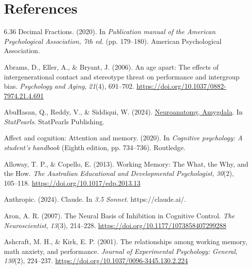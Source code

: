 \documentclass[
  stu, a4paper,floatsintext]{apa7}
\newlength{\cslhangindent}
\newenvironment{CSLReferences}[2] %
 {\begin{list}{}{%
  \setlength{\itemindent}{0pt}
  \setlength{\leftmargin}{0pt}
  \setlength{\parsep}{0pt}
  \ifodd #1
   \setlength{\leftmargin}{\cslhangindent}
   \setlength{\itemindent}{-1\cslhangindent}
  \fi
  \setlength{\itemsep}{#2\baselineskip}}}
 {\end{list}}
\begin{document}
\newpage

\section{References}\label{references}

\label{refs}
\begin{CSLReferences}{1}{0}
6.36 {Decimal Fractions}. (2020). In \emph{Publication manual of the {American Psychological Association}, 7th ed.} (pp. 179--180). American Psychological Association.

Abrams, D., Eller, A., \& Bryant, J. (2006). An age apart: {The} effects of intergenerational contact and stereotype threat on performance and intergroup bias. \emph{Psychology and Aging}, \emph{21}(4), 691--702. \url{https://doi.org/10.1037/0882-7974.21.4.691}

AbuHasan, Q., Reddy, V., \& Siddiqui, W. (2024). \href{https://www.ncbi.nlm.nih.gov/pubmed/30725787}{Neuroanatomy, {Amygdala}}. In \emph{{StatPearls}}. StatPearls Publishing.

Affect and cognition: Attention and memory. (2020). In \emph{Cognitive psychology: A student's handbook} (Eighth edition, pp. 734--736). Routledge.

Alloway, T. P., \& Copello, E. (2013). Working {Memory}: {The What}, the {Why}, and the {How}. \emph{The Australian Educational and Developmental Psychologist}, \emph{30}(2), 105--118. \url{https://doi.org/10.1017/edp.2013.13}

Anthropic. (2024). Claude. In \emph{3.5 Sonnet}. https://claude.ai/.

Aron, A. R. (2007). The {Neural Basis} of {Inhibition} in {Cognitive Control}. \emph{The Neuroscientist}, \emph{13}(3), 214--228. \url{https://doi.org/10.1177/1073858407299288}

Ashcraft, M. H., \& Kirk, E. P. (2001). The relationships among working memory, math anxiety, and performance. \emph{Journal of Experimental Psychology: General}, \emph{130}(2), 224--237. \url{https://doi.org/10.1037/0096-3445.130.2.224}


\end{CSLReferences}
\end{document}
